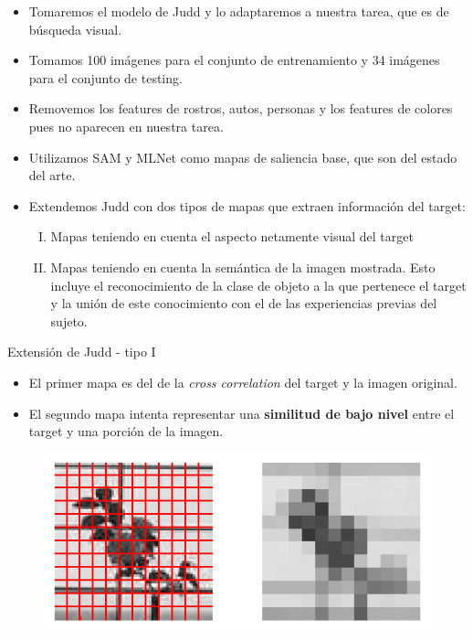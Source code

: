 \documentclass[compress]{beamer}
\begin{document}
\begin{frame}
\begin{itemize}
\item Tomaremos el modelo de Judd y lo adaptaremos a nuestra tarea, que es de búsqueda visual.
\item Tomamos 100 imágenes para el conjunto de entrenamiento y 34 imágenes para el conjunto de testing.
\item Removemos los features de rostros, autos, personas y los features de colores pues no aparecen en nuestra tarea.
\item Utilizamos SAM y MLNet como mapas de saliencia base, que son del estado del arte.
\bigskip
\item Extendemos Judd con dos tipos de mapas que extraen información del target:
\begin{enumerate}[I.]
\item Mapas teniendo en cuenta el aspecto netamente visual del target
\item Mapas teniendo en cuenta la semántica de la imagen mostrada. Esto incluye el reconocimiento de la clase de objeto a la que pertenece el target y la unión de este conocimiento con el de las experiencias previas del sujeto.
\end{enumerate}
\end{itemize}
\end{frame}

\begin{frame}{Extensión de Judd - tipo I}

\begin{itemize}
\item El primer mapa es del de la \textit{cross correlation} del target y la imagen original.
\item El segundo mapa intenta representar una \textbf{similitud de bajo nivel} entre el target y una porción de la imagen.
\end{itemize}

\begin{figure}
\includegraphics[width=0.7\linewidth]{images/grilla-gorda.png} 
\end{figure}

\end{frame}
\end{document}
